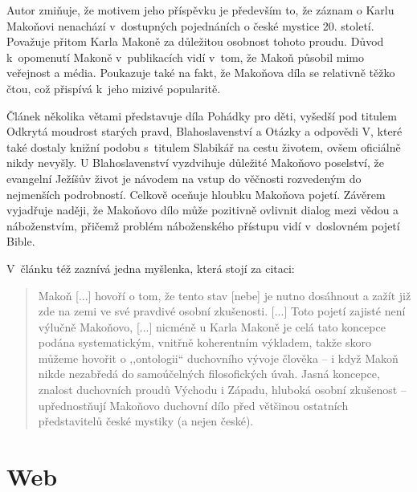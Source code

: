 Autor zmiňuje, že motivem jeho příspěvku je především to, že záznam o Karlu Makoňovi
nenachází v~dostupných pojednáních o české mystice 20. století. Považuje přitom
Karla Makoně za důležitou osobnost tohoto proudu. Důvod k~opomenutí Makoně
v~publikacích vidí v~tom, že Makoň působil mimo veřejnost a média. Poukazuje
také na fakt, že Makoňova díla se relativně těžko čtou, což přispívá k~jeho
mizivé popularitě.

Článek několika větami představuje díla Pohádky pro děti, vyšedší pod titulem
Odkrytá moudrost starých pravd\cite{makon1992odkryta},
Blahoslavenství\cite{makon2000blahoslavenstvi} a Otázky a odpovědi V, které
také dostaly knižní podobu s~titulem Slabikář na cestu životem, ovšem oficiálně
nikdy nevyšly. U Blahoslavenství vyzdvihuje důležité Makoňovo poselství, že
evangelní Ježíšův život je návodem na vstup do věčnosti rozvedeným do nejmenších
podrobností. Celkově oceňuje hloubku Makoňova pojetí. Závěrem vyjadřuje naději,
že Makoňovo dílo může pozitivně ovlivnit dialog mezi vědou a náboženstvím,
přičemž problém náboženského přístupu vidí v~doslovném pojetí Bible.

V~článku též zaznívá jedna myšlenka, která stojí za citaci:
\begin{quote}
Makoň [...] hovoří o tom, že tento stav [nebe] je
nutno dosáhnout a zažít již zde na zemi ve
své pravdivé osobní zkušenosti. [...]
Toto pojetí zajisté není výlučně Makoňovo, [...]
nicméně u Karla Makoně je celá tato koncepce podána systematickým, vnitřně
koherentním výkladem, takže skoro můžeme hovořit o ,,ontologii`` duchovního
vývoje člověka -- i když Makoň nikde nezabředá do samoúčelných filosofických
úvah. Jasná koncepce, znalost duchovních proudů Východu i Západu, hluboká osobní
zkušenost -- upřednostňují Makoňovo duchovní dílo před většinou ostatních
představitelů české mystiky (a nejen české).
\end{quote}

\section{Web}

